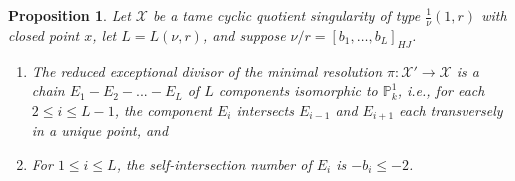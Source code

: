 \documentclass[12pt]{amsart}
\numberwithin{equation}{section}
\newtheorem{prop}[equation]{Proposition}
\theoremstyle{definition}
\newcommand{\mc}[1]{\mathcal{#1}}
\newcommand{\ints}{\mathbb Z}
\renewcommand{\P}{\mathbb P}
\begin{document}
\begin{prop}\label{prop: resolution of tame cyclic quotient singularities}
    Let $\mc{X}$ be a tame cyclic quotient singularity of type
    $\frac{1}{\nu}(1,r)$ with closed point $x$, let $L=L(\nu,r)$, and
    suppose $\nu/r = [b_1, \ldots, b_L]_{HJ}$.

    \begin{enumerate}[\upshape (i)]
      \item
   The reduced exceptional divisor of the minimal resolution
$\pi:\mc{X}'\to\mc{X}$ is a chain $E_1-E_2-...-E_L$ of $L$ components
isomorphic to $\P^1_k$, i.e., for each $2 \leq i\leq L-1$, the
component $E_i$ intersects $E_{i-1}$ and $E_{i+1}$ each transversely
in a unique point, and
\item For $1 \leq i \leq L$, the self-intersection number of $E_i$ is $-b_i \leq -2$.
  \end{enumerate}
   
\end{prop}
\end{document}
